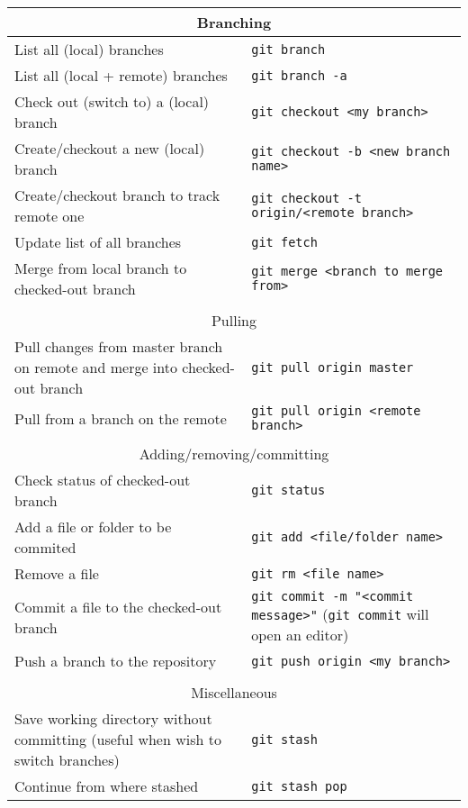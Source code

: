 \documentclass[11pt]{article}
\begin{document}
\noindent\begin{tabular}[t]{p{} p{}} \hline
	\multicolumn{2}{c}{Branching} \\ \hline
	List all (local) branches						& \verb|git branch| \\
	List all (local + remote) branches 				& \verb|git branch -a| \\
	Check out (switch to) a (local) branch						& \verb|git checkout <my branch>| \\
	Create/checkout a new (local) branch				& \verb|git checkout -b <new branch name>| \\
	Create/checkout branch to track remote one & \verb|git checkout -t origin/<remote branch>| \\
	Update list of all branches						& \verb|git fetch| \\
	Merge from local branch to checked-out branch 	& \verb|git merge <branch to merge from>| \\
	
	\\ \hline
	\multicolumn{2}{c}{Pulling} \\ \hline
	Pull changes from master branch on remote and merge into checked-out branch		& \verb|git pull origin master| \\
	Pull from a branch on the remote 			& \verb|git pull origin <remote branch>| \\

	\\ \hline
	\multicolumn{2}{c}{Adding/removing/committing} \\ \hline
	Check status of checked-out branch		& \verb|git status| \\
	Add a file or folder to be commited		& \verb|git add <file/folder name>| \\
	Remove a file	& \verb|git rm <file name>| \\
	Commit a file to the checked-out branch	& \verb|git commit -m "<commit message>"| (\verb|git commit| will open an editor) \\
	Push a branch to the repository  			&\verb|git push origin <my branch>| \\
	
	\\ \hline
	\multicolumn{2}{c}{Miscellaneous} \\ \hline
	Save working directory without committing (useful when wish to switch branches) & \verb|git stash| \\
	Continue from where stashed								& \verb|git stash pop|
\end{tabular}
\end{document}
